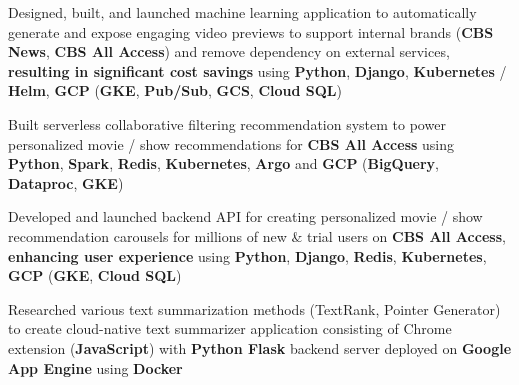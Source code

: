 \begin{cventries}
{\begin{cvitems}
            \item {Designed, built, and launched machine learning application to automatically generate and expose engaging video previews to support internal brands (\textbf{CBS News}, \textbf{CBS All Access}) and remove dependency on external services, \textbf{resulting in significant cost savings} using \textbf{Python}, \textbf{Django}, \textbf{Kubernetes} / \textbf{Helm}, \textbf{GCP} (\textbf{GKE}, \textbf{Pub/Sub}, \textbf{GCS}, \textbf{Cloud SQL})}
 		\item {Built serverless collaborative filtering recommendation system to power personalized movie / show recommendations for \textbf{CBS All Access} using \textbf{Python}, \textbf{Spark}, \textbf{Redis}, \textbf{Kubernetes}, \textbf{Argo} and \textbf{GCP} (\textbf{BigQuery}, \textbf{Dataproc}, \textbf{GKE})}
        \item {Developed and launched backend API for creating personalized movie / show recommendation carousels for millions of new \& trial users on \textbf{CBS All Access}, \textbf{enhancing user experience} using \textbf{Python}, \textbf{Django}, \textbf{Redis}, \textbf{Kubernetes}, \textbf{GCP} (\textbf{GKE}, \textbf{Cloud SQL})}
  		\item {Researched various text summarization methods (TextRank, Pointer Generator) to create cloud-native text summarizer application consisting of Chrome extension (\textbf{JavaScript}) with \textbf{Python Flask} backend server deployed on \textbf{Google App Engine} using \textbf{Docker}}

\end{cvitems}}
\end{cventries}
